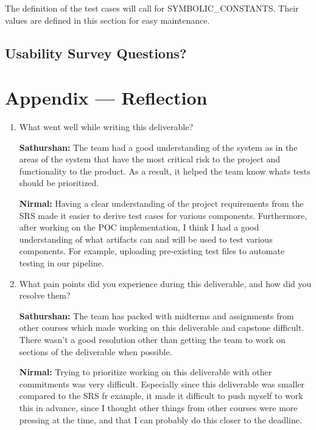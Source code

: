 \documentclass[12pt, titlepage]{article}
\begin{document}
The definition of the test cases will call for SYMBOLIC\_CONSTANTS.
Their values are defined in this section for easy maintenance.

\subsection{Usability Survey Questions?}


\newpage{}
\section*{Appendix --- Reflection}

\begin{enumerate}
  \item What went well while writing this deliverable?

  \textbf{Sathurshan:} The team had a good understanding of the system as in
  the areas of the system that have the most critical risk to the project and
  functionality to the product. As a result, it helped the team know whats tests
  should be prioritized.

  \textbf{Nirmal:} Having a clear understanding of the project requirements 
  from the SRS made it easier to derive test cases for various components. 
  Furthermore, after working on the POC implementation, I think I had a good 
  understanding of what artifacts can and will be used to test various 
  components. For example, uploading pre-existing test files to automate 
  testing in our pipeline.

  \item What pain points did you experience during this deliverable, and how
    did you resolve them?

  \textbf{Sathurshan:} The team has packed with midterms and assignments from
  other courses which made working on this deliverable and capstone difficult.
  There wasn't a good resolution other than getting the team to work on sections
  of the deliverable when possible.

  \textbf{Nirmal:} Trying to prioritize working on this deliverable with other 
  commitments was very difficult. Especially since this deliverable was smaller 
  compared to the SRS fr example, it made it difficult to push myself to work 
  this in advance, since I thought other things from other courses were more 
  pressing at the time, and that I can probably do this closer to the deadline.


\end{enumerate}
\end{document}
